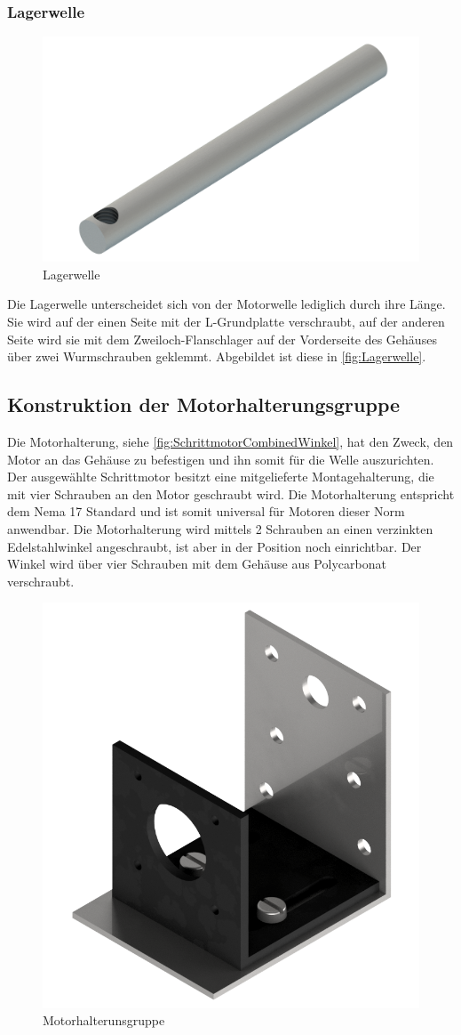 \pagebreak
\subsubsection{Lagerwelle}
\begin{figure}
    \includegraphics[width=8 cm]{fig/mech/Lagerwelle.png}
    \caption{Lagerwelle}
    \label{fig:Lagerwelle}
\end{figure}

Die Lagerwelle unterscheidet sich von der Motorwelle lediglich durch ihre Länge.
Sie wird auf der einen Seite mit der L-Grundplatte verschraubt, auf der anderen Seite wird sie mit dem Zweiloch-Flanschlager auf der Vorderseite des Gehäuses über
zwei Wurmschrauben geklemmt.
Abgebildet ist diese in \autoref{fig:Lagerwelle}.\\




\subsection{Konstruktion der Motorhalterungsgruppe}


Die Motorhalterung, siehe \autoref{fig:SchrittmotorCombinedWinkel}, hat den Zweck, den Motor an das Gehäuse zu befestigen und ihn somit für die Welle auszurichten.
Der ausgewählte Schrittmotor besitzt eine mitgelieferte Montagehalterung, die mit vier Schrauben an den Motor geschraubt wird.
Die Motorhalterung entspricht dem Nema 17 Standard und ist somit universal für Motoren dieser Norm anwendbar.
Die Motorhalterung wird mittels 2 Schrauben an einen verzinkten Edelstahlwinkel angeschraubt, ist aber in der Position noch einrichtbar.
Der Winkel wird über vier Schrauben mit dem Gehäuse aus Polycarbonat verschraubt. \\

\begin{figure}[H]
    \centering
    \includegraphics[width=6 cm]{fig/mech/SchrittmotorCombinedWinkel}
    \caption{Motorhalterunsgruppe}
    \label{fig:SchrittmotorCombinedWinkel}
\end{figure}

